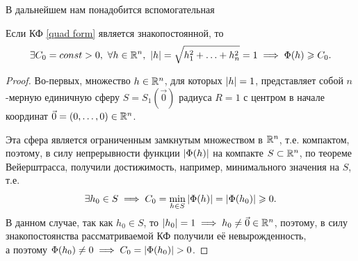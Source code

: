 \documentclass[../../main.tex]{subfiles}
\begin{document}
	В дальнейшем нам понадобится вспомогательная
	\begin{lem}
		Если КФ \eqref{quad form} является знакопостоянной, то
		\begin{equation}
		\label{eval form}
			\exists C_0 = const > 0,\ 
			\forall h \in \R^n,\ \abs{h} = \sqrt{h_1^2 + \ldots + h_n^2} = 1
			\implies \Phi(h) \ge C_0.
		\end{equation}
	\end{lem}
	\begin{proof}
		Во-первых, множество $h \in \mathbb{R}^n$, для которых $\left|{h}\right| = 1$,
		представляет собой $n$-мерную единичную сферу $S = S_1(\vec{0})$
		радиуса $R = 1$ с центром в начале координат
		$\vec{0} = (0, \ldots, 0) \in \mathbb{R}^n$.
		
		Эта сфера является ограниченным замкнутым множеством в $\mathbb{R}^n$, т.е.
		компактом, поэтому, в силу непрерывности функции $\left|{\Phi(h)}\right|$
		на компакте $S \subset \mathbb{R}^n$, по теореме Вейерштрасса, получили
		достижимость, например, минимального значения на $S$, т.е.
		\[
			\exists h_0 \in S \implies
			C_0 = \min_{h \in S} \left|{\Phi(h)}\right|
			= \left|{\Phi(h_0)}\right| \geqslant 0.
		\]
		В данном случае, так как $h_0 \in S$, то
		$\left|{h_0}\right| = 1 \implies h_0 \ne \vec{0} \in \mathbb{R}^n$,
		поэтому, в силу знакопостоянства рассматриваемой КФ
		получили её невырожденность, \\
		а поэтому $\Phi(h_0) \ne 0 \implies C_0 = \left|{\Phi(h_0)}\right| > 0$.
	\end{proof}
\end{document}
